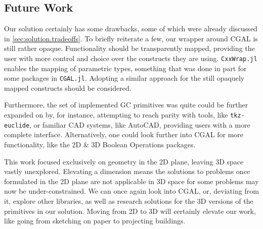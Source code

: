 \subsection*{Future Work}

Our solution certainly has some drawbacks, some of which were already discussed
in \cref{sec:solution.tradeoffs}.  To briefly reiterate a few, our wrapper
around \ac{CGAL} is still rather opaque.  Functionality should be transparently
mapped, providing the user with more control and choice over the constructs they
are using.  \texttt{CxxWrap.jl} enables the mapping of parametric types,
something that was done in part for some packages in \texttt{CGAL.jl}.  Adopting
a similar approach for the still opaquely mapped constructs should be
considered.

Furthermore, the set of implemented \ac{GC} primitives was quite could be
further expanded on by, for instance, attempting to reach parity with tools,
like \texttt{tkz-euclide}, or familiar \ac{CAD} systems, like AutoCAD, providing
users with a more complete interface.  Alternatively, one could look further
into \ac{CGAL} for more functionality, like the 2D \& 3D Boolean Operations
packages.

This work focused exclusively on geometry in the 2D plane, leaving 3D space
vastly unexplored.  Elevating a dimension means the solutions to problems once
formulated in the 2D plane are not applicable in 3D space for some problems may
now be under-constrained.  We can once again look into \ac{CGAL}, or, deviating
from it, explore other libraries, as well as research solutions for the 3D
versions of the primitives in our solution. Moving from 2D to 3D will certainly
elevate our work, like going from sketching on paper to projecting buildings.
